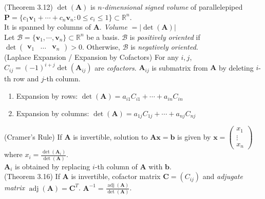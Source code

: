 \documentclass{article}
\theoremstyle{definition}
\DeclareMathOperator{\adj}{adj}
\begin{document}
(Theorem 3.12) $\det(\mathbf{A})$ is \textit{$n$-dimensional signed volume} of parallelepiped $\mathbf{P}=\{c_{1}\mathbf{v}_{1}+\cdots+c_{n}\mathbf{v}_{n}:0\leq c_{i}\leq 1\}\subset\mathbb{R}^{n}$.\\
It is spanned by columns of $\mathbf{A}$. \textit{Volume} $=\left|\det(\mathbf{A})\right|$\\
Let $\mathcal{B}=\{\mathbf{v}_{1},\cdots,\mathbf{v}_{n}\}\subset\mathbb{R}^{n}$ be a basis. $\mathcal{B}$ is \textit{positively oriented} if $\det\begin{pmatrix}
    \mathbf{v}_{1} & \hdots & \mathbf{v}_{n}
\end{pmatrix}>0$. Otherwise, $\mathcal{B}$ is \textit{negatively oriented}.\\
(Laplace Expansion / Expansion by Cofactors) For any $i,j$,\\
$C_{ij}=(-1)^{i+j}\det(\mathbf{A}_{ij})$ are \textit{cofactors}. $\mathbf{A}_{ij}$ is submatrix from $\mathbf{A}$ by deleting $i$-th row and $j$-th column.
\begin{enumerate}
    \item Expansion by rows: $\det(\mathbf{A})=a_{i1}C_{i1}+\cdots+a_{in}C_{in}$
    \item Expansion by columns: $\det(\mathbf{A})=a_{1j}C_{1j}+\cdots+a_{nj}C_{nj}$
\end{enumerate}
(Cramer's Rule) If $\mathbf{A}$ is invertible, solution to $\mathbf{Ax}=\mathbf{b}$ is given by $\mathbf{x}=\begin{pmatrix}
    x_{1}\\
    \vdots\\
    x_{n}
\end{pmatrix}$ where $x_{i}=\frac{\det(\mathbf{A}_{i})}{\det(\mathbf{A})}$.\\
$\mathbf{A}_{i}$ is obtained by replacing $i$-th column of $\mathbf{A}$ with $\mathbf{b}$.\\
(Theorem 3.16) If $\mathbf{A}$ is invertible, cofactor matrix $\mathbf{C}=(C_{ij})$ and \textit{adjugate matrix} $\adj(\mathbf{A})=\mathbf{C}^{T}$. $\mathbf{A}^{-1}=\frac{\adj(\mathbf{A})}{\det(\mathbf{A})}$.
\newpage
\end{document}
